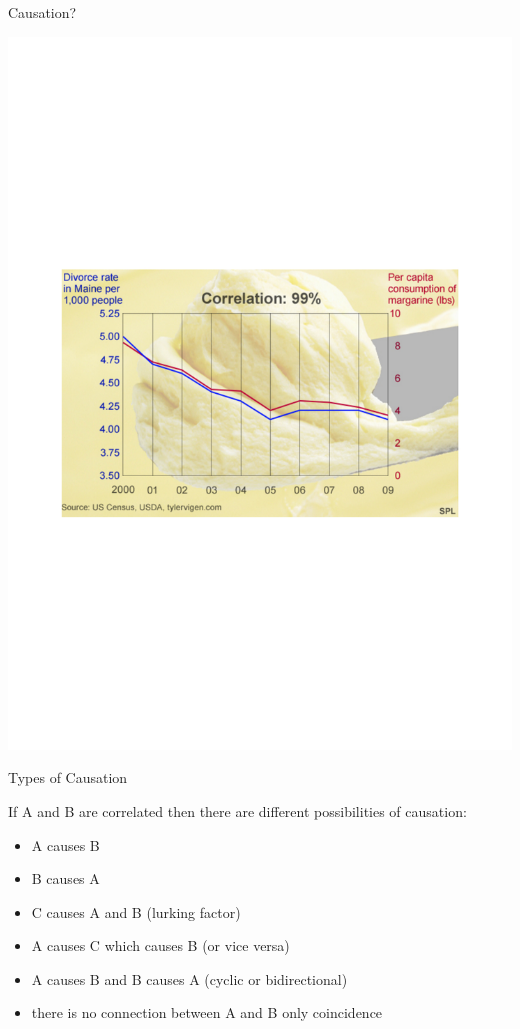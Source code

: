 \documentclass{beamer}
\begin{document}
\begin{frame}{Causation?}
\vspace{-5cm}
\begin{center}
\includegraphics[scale=0.6]{pics/wk3/marg.pdf}
\end{center}


\end{frame}



\begin{frame}{Types of Causation}

If A and B are correlated then there are different possibilities of causation:
\begin{itemize}
\item A causes B
\item B causes A
\item C causes A and B (lurking factor)
\item A causes C which causes B (or vice versa)
\item A causes B and B causes A (cyclic or bidirectional)
\item there is no connection between A and B only coincidence
\end{itemize}


\end{frame}
\end{document}
